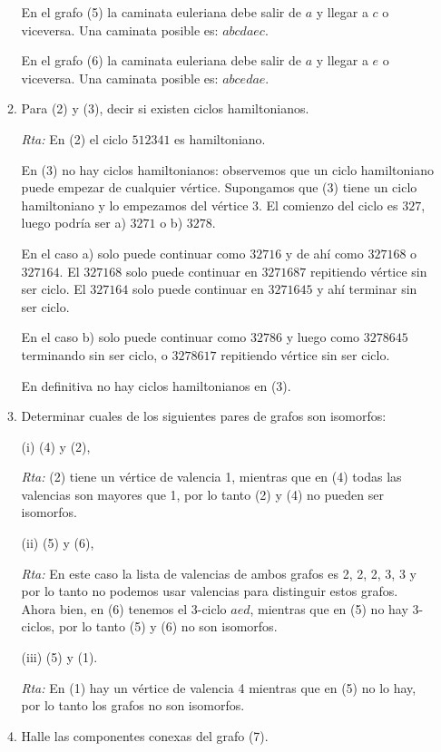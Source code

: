 \documentclass[12pt,spanish,makeidx]{amsbook}
\theoremstyle{definition}
\theoremstyle{remark}
\newcommand{\rta}{\noindent\textit{Rta: }}
\begin{document}
\begin{enumerate}
\begin{enumerate}
	En  el grafo (5) la caminata euleriana debe salir de $a$ y llegar a $c$ o viceversa. Una caminata posible es: $abcdaec$.
	
	En  el grafo (6) la caminata euleriana debe salir de $a$ y llegar a $e$ o viceversa. Una caminata posible es: $abcedae$.
	
	\item Para (2) y (3), decir si existen ciclos hamiltonianos.
	
	\rta En (2) el  ciclo $512341$ es hamiltoniano. 
	
	
	En (3) no hay ciclos hamiltonianos: observemos  que un ciclo hamiltoniano puede empezar de cualquier vértice. Supongamos que (3) tiene un ciclo hamiltoniano y lo empezamos del vértice $3$. El comienzo del ciclo es $327$, luego podría ser  a) $3271$ o  b) $3278$. 
	
	En  el caso a) solo  puede continuar como $32716$ y  de ahí  como $327168$ o $327164$. El $327168$ solo puede continuar en $3271687$ repitiendo vértice sin ser ciclo. El  $327164$ solo puede continuar en $3271645$ y ahí terminar  sin ser ciclo. 
	
	En  el caso b) solo puede continuar como $32786$ y luego  como $3278645$ terminando sin ser ciclo,  o $3278617$ repitiendo vértice sin ser ciclo. 
	
	En  definitiva no hay ciclos hamiltonianos en (3). 
	
	\item Determinar cuales de los siguientes pares de grafos son isomorfos:
	
	(i) (4) y (2),\quad 
	
	\rta (2) tiene un vértice de  valencia 1, mientras que en  (4) todas las valencias son mayores que 1, por lo tanto (2) y (4) no pueden ser isomorfos. 
	
	(ii) (5) y (6), \quad 
	
	\rta En este caso  la lista de valencias de ambos grafos es 2, 2, 2, 3, 3 y por lo tanto no podemos usar valencias para distinguir estos grafos. Ahora bien, en (6) tenemos el 3-ciclo $aed$, mientras que en (5) no hay 3-ciclos, por lo tanto (5) y (6) no son isomorfos.   
	
	(iii) (5) y (1). 
	
	\rta 
	En (1) hay un vértice de valencia 4 mientras que  en (5) no lo hay, por lo tanto los grafos no son isomorfos. 
	
	
	
	\item Halle las componentes conexas del grafo (7).
	

\end{enumerate}
\end{enumerate}
\end{document}
